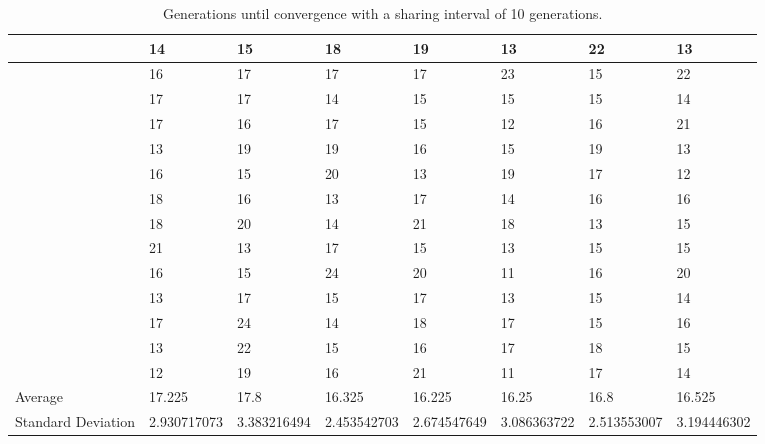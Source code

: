 \documentclass[12pt]{article} %
\begin{document}
\begin{sidewaystable}
\begin{tabular}{|l|l|l|l|l|l|l|l|}
    ~                  & 14          & 15                         & 18          & 19          & 13          & 22          & 13          \\ \hline
    ~                  & 16          & 17                         & 17          & 17          & 23          & 15          & 22          \\ \hline
    ~                  & 17          & 17                         & 14          & 15          & 15          & 15          & 14          \\ \hline
    ~                  & 17          & 16                         & 17          & 15          & 12          & 16          & 21          \\ \hline
    ~                  & 13          & 19                         & 19          & 16          & 15          & 19          & 13          \\ \hline
    ~                  & 16          & 15                         & 20          & 13          & 19          & 17          & 12          \\ \hline
    ~                  & 18          & 16                         & 13          & 17          & 14          & 16          & 16          \\ \hline
    ~                  & 18          & 20                         & 14          & 21          & 18          & 13          & 15          \\ \hline
    ~                  & 21          & 13                         & 17          & 15          & 13          & 15          & 15          \\ \hline
    ~                  & 16          & 15                         & 24          & 20          & 11          & 16          & 20          \\ \hline
    ~                  & 13          & 17                         & 15          & 17          & 13          & 15          & 14          \\ \hline
    ~                  & 17          & 24                         & 14          & 18          & 17          & 15          & 16          \\ \hline
    ~                  & 13          & 22                         & 15          & 16          & 17          & 18          & 15          \\ \hline
    ~                  & 12          & 19                         & 16          & 21          & 11          & 17          & 14          \\ \hline
    Average            & 17.225      & 17.8                       & 16.325      & 16.225      & 16.25       & 16.8        & 16.525      \\ \hline
    Standard Deviation & 2.930717073 & 3.383216494                & 2.453542703 & 2.674547649 & 3.086363722 & 2.513553007 & 3.194446302 \\ \hline
    \end{tabular}
    \caption{Generations until convergence with a sharing interval of 10 generations.}
\end{sidewaystable}
\end{document}
